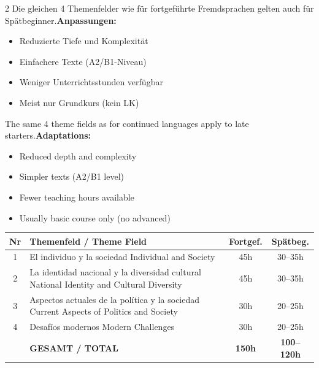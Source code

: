 \documentclass[10pt,a4paper]{article}
\begin{document}
\begin{paracol}{2}
\small
Die gleichen 4 Themenfelder wie für fortgeführte Fremdsprachen gelten auch für Spätbeginner.\footnotemark[4] \textbf{Anpassungen:}
\begin{itemize}[noitemsep,topsep=2pt]
\item Reduzierte Tiefe und Komplexität
\item Einfachere Texte (A2/B1-Niveau)
\item Weniger Unterrichtsstunden verfügbar
\item Meist nur Grundkurs (kein LK)
\end{itemize}

\switchcolumn

\small\color{english}
The same 4 theme fields as for continued languages apply to late starters.\footnotemark[4] \textbf{Adaptations:}
\begin{itemize}[noitemsep,topsep=2pt]
\item Reduced depth and complexity
\item Simpler texts (A2/B1 level)
\item Fewer teaching hours available
\item Usually basic course only (no advanced)
\end{itemize}

\end{paracol}


\vspace{2mm}

\begin{center}
\scriptsize
\begin{tabular}{|c|p{5cm}|c|c|}
\hline
\rowcolor{lightgray}
\textbf{Nr} & \textbf{Themenfeld / Theme Field} & \textbf{Fortgef.} & \textbf{Spätbeg.} \\
\hline
1 & El individuo y la sociedad \newline \textcolor{english}{\footnotesize Individual and Society} & 45h & \textcolor{spaet}{30--35h} \\
\hline
2 & La identidad nacional y la diversidad cultural \newline \textcolor{english}{\footnotesize National Identity and Cultural Diversity} & 45h & \textcolor{spaet}{30--35h} \\
\hline
3 & Aspectos actuales de la política y la sociedad \newline \textcolor{english}{\footnotesize Current Aspects of Politics and Society} & 30h & \textcolor{spaet}{20--25h} \\
\hline
4 & Desafíos modernos \newline \textcolor{english}{\footnotesize Modern Challenges} & 30h & \textcolor{spaet}{20--25h} \\
\hline
\rowcolor{lightspaet}
& \textbf{GESAMT / TOTAL} & \textbf{150h} & \textcolor{spaet}{\textbf{100--120h}} \\
\hline
\end{tabular}
\end{center}
\end{document}
